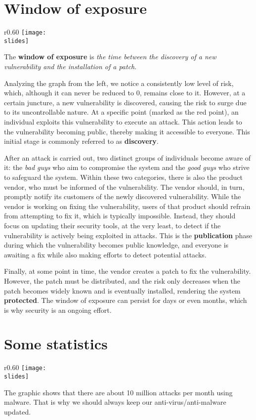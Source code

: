 \newpage
\section{Window of exposure}
\begin{wrapfigure}{r}{0.60\textwidth}
\centering
    \texttt{[image: \\slides]}
\end{wrapfigure}
The \textbf{window of exposure} is \emph{the time between the discovery of a new vulnerability and the installation of a patch}.


Analyzing the graph from the left, we notice a consistently low level of risk, which, although it can never be reduced to 0, remains close to it.
However, at a certain juncture, a new vulnerability is discovered, causing the risk to surge due to its uncontrollable nature.
At a specific point (marked as the red point), an individual exploits this vulnerability to execute an attack. This action leads to the vulnerability becoming public, thereby making it accessible to everyone.
This initial stage is commonly referred to as \textbf{discovery}.

After an attack is carried out, two distinct groups of individuals become aware of it: the \emph{bad guys} who aim to compromise the system and the \emph{good guys} who strive to safeguard the system. Within these two categories, there is also the product vendor, who must be informed of the vulnerability. The vendor should, in turn, promptly notify its customers of the newly discovered vulnerability. While the vendor is working on fixing the vulnerability, users of that product should refrain from attempting to fix it, which is typically impossible. Instead, they should focus on updating their security tools, at the very least, to detect if the vulnerability is actively being exploited in attacks. This is the \textbf{publication} phase during which the vulnerability becomes public knowledge, and everyone is awaiting a fix while also making efforts to detect potential attacks.

Finally, at some point in time, the vendor creates a patch to fix the vulnerability. However, the patch must be distributed, and the risk only decreases when the patch becomes widely known and is eventually installed, rendering the system \textbf{protected}. The window of exposure can persist for days or even months, which is why security is an ongoing effort.

\section{Some statistics}
\begin{wrapfigure}{r}{0.60\textwidth}
\centering
    \texttt{[image: \\slides]}
\end{wrapfigure}
The graphic shows that there are about 10 million attacks per month using malware. That is why we should always keep our anti-virus/anti-malware updated.\\



